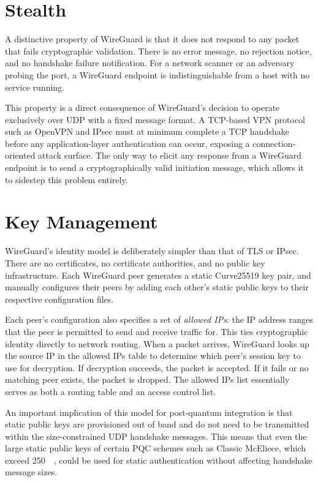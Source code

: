 \section{Stealth}\label{sec:wg-stealth}
A distinctive property of WireGuard is that it does not respond to any packet that fails cryptographic validation. There is no error message, no rejection notice, and no handshake failure notification. For a network scanner or an adversary probing the port, a WireGuard endpoint is indistinguishable from a host with no service running.

This property is a direct consequence of WireGuard's decision to operate exclusively over UDP with a fixed message format. A TCP-based VPN protocol such as OpenVPN and IPsec must at minimum complete a TCP handshake before any application-layer authentication can occur, exposing a connection-oriented attack surface. The only way to elicit any response from a WireGuard endpoint is to send a cryptographically valid initiation message, which allows it to sidestep this problem entirely.

\section{Key Management}\label{sec:wg-keys}
WireGuard's identity model is deliberately simpler than that of TLS or IPsec. There are no certificates, no certificate authorities, and no public key infrastructure. Each WireGuard peer generates a static Curve25519 key pair, and manually configures their peers by adding each other's static public keys to their respective configuration files. 

Each peer's configuration also specifies a set of \textit{allowed IPs}: the IP address ranges that the peer is permitted to send and receive traffic for. This ties cryptographic identity directly to network routing. When a packet arrives, WireGuard looks up the source IP in the allowed IPs table to determine which peer's session key to use for decryption. If decryption succeeds, the packet is accepted. If it fails or no matching peer exists, the packet is dropped. The allowed IPs list essentially serves as both a routing table and an access control list.

An important implication of this model for post-quantum integration is that static public keys are provisioned out of band and do not need to be   transmitted within the size-constrained UDP handshake messages. This means that even the large static public keys of certain PQC schemes such as Classic McEliece, which exceed \qty{250}{\kilo\byte}, could be used for static authentication without affecting handshake message sizes.


